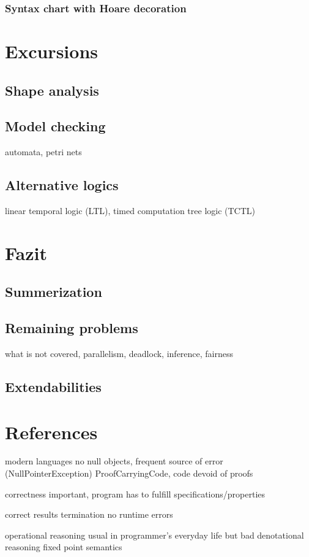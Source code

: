 \subsection{Syntax chart with Hoare decoration}

\chapter{Excursions}
\section{Shape analysis}
\section{Model checking}
automata, petri nets
\section{Alternative logics}
linear temporal logic (LTL), timed computation tree logic (TCTL)

\chapter{Fazit}
\section{Summerization}
\section{Remaining problems}
what is not covered, parallelism, deadlock, inference, fairness
\section{Extendabilities}

\chapter{References}

modern languages no null objects, frequent source of error (NullPointerException)
ProofCarryingCode, code devoid of proofs

correctness important, program has to fulfill specifications/properties

correct results
termination
no runtime errors

operational reasoning usual in programmer's everyday life but bad
denotational reasoning
fixed point semantics

